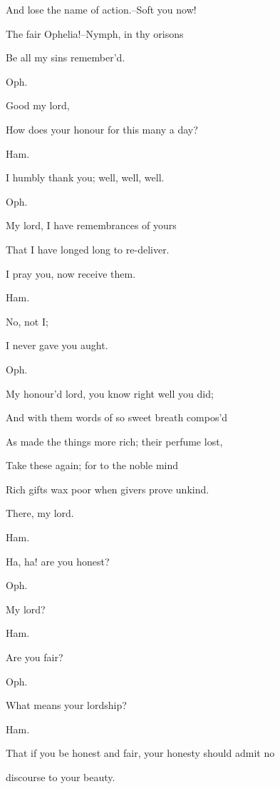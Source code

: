 \documentclass[12pt]{book}
\begin{document}
And lose the name of action.--Soft you now!

The fair Ophelia!--Nymph, in thy orisons

Be all my sins remember'd.



Oph.

Good my lord,

How does your honour for this many a day?



Ham.

I humbly thank you; well, well, well.



Oph.

My lord, I have remembrances of yours

That I have longed long to re-deliver.

I pray you, now receive them.



Ham.

No, not I;

I never gave you aught.



Oph.

My honour'd lord, you know right well you did;

And with them words of so sweet breath compos'd

As made the things more rich; their perfume lost,

Take these again; for to the noble mind

Rich gifts wax poor when givers prove unkind.

There, my lord.



Ham.

Ha, ha! are you honest?



Oph.

My lord?



Ham.

Are you fair?



Oph.

What means your lordship?



Ham.

That if you be honest and fair, your honesty should admit no

discourse to your beauty.
\end{document}
